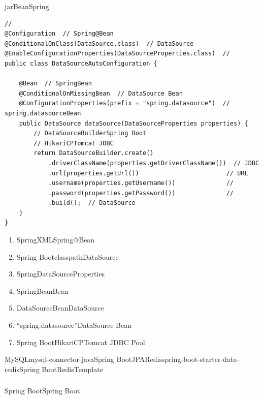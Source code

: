 \important{}jar\important{}\important{}Bean\important{}Spring

\begin{lstlisting}[style=java]
// 
@Configuration  // Spring@Bean
@ConditionalOnClass(DataSource.class)  // DataSource
@EnableConfigurationProperties(DataSourceProperties.class)  // 
public class DataSourceAutoConfiguration {
    
    @Bean  // SpringBean
    @ConditionalOnMissingBean  // DataSource Bean
    @ConfigurationProperties(prefix = "spring.datasource")  // spring.datasourceBean
    public DataSource dataSource(DataSourceProperties properties) {
        // DataSourceBuilderSpring Boot
        // HikariCPTomcat JDBC
        return DataSourceBuilder.create()
            .driverClassName(properties.getDriverClassName())  // JDBC
            .url(properties.getUrl())                        // URL
            .username(properties.getUsername())              // 
            .password(properties.getPassword())              // 
            .build();  // DataSource
    }
}
\end{lstlisting}

\important{}

\begin{enumerate}
\def\labelenumi{\arabic{enumi}.}
\item
  SpringXMLSpring@Bean
\item
  Spring BootclasspathDataSource
\item
  SpringDataSourceProperties
\item
  SpringBeanBean
\item
  DataSourceBeanDataSource
\item
  ``spring.datasource''DataSource
  Bean
\item
  Spring BootHikariCPTomcat JDBC Pool
\end{enumerate}

MySQLmysql-connector-javaSpring
BootJPARedisspring-boot-starter-data-redisSpring BootRedisTemplate

\hypertarget{section-22}{%
\subsubsection{}\label{section-22}}

Spring BootSpring Boot\important{}


